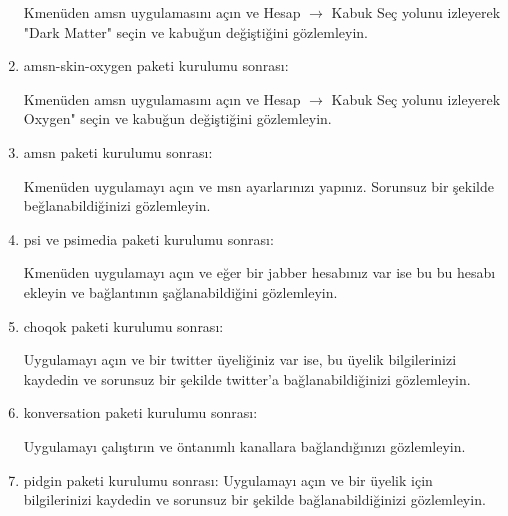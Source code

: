 \documentclass[a4paper,10pt]{article}
\begin{document}
\begin{enumerate}
Kmenüden amsn uygulamasını açın ve Hesap $\rightarrow$ Kabuk Seç yolunu izleyerek "Dark Matter" seçin ve kabuğun değiştiğini gözlemleyin.

\item amsn-skin-oxygen paketi kurulumu sonrası:

Kmenüden amsn uygulamasını açın ve Hesap $\rightarrow$ Kabuk Seç yolunu izleyerek Oxygen" seçin ve kabuğun değiştiğini gözlemleyin.

\item amsn paketi kurulumu sonrası:

Kmenüden uygulamayı açın ve msn ayarlarınızı yapınız. Sorunsuz bir şekilde beğlanabildiğinizi gözlemleyin.

\item psi ve psimedia paketi kurulumu sonrası:

Kmenüden uygulamayı açın ve eğer bir jabber hesabınız var ise bu bu hesabı ekleyin ve bağlantının şağlanabildiğini gözlemleyin.

\item choqok paketi kurulumu sonrası:

Uygulamayı açın ve bir twitter üyeliğiniz var ise, bu üyelik bilgilerinizi kaydedin ve sorunsuz bir şekilde twitter'a bağlanabildiğinizi gözlemleyin.	
\item konversation paketi kurulumu sonrası:

Uygulamayı çalıştırın ve öntanımlı kanallara bağlandığınızı gözlemleyin.

\item pidgin paketi kurulumu sonrası:
Uygulamayı açın ve bir üyelik için bilgilerinizi kaydedin ve sorunsuz bir şekilde bağlanabildiğinizi gözlemleyin.

\end{enumerate}
\end{document}
